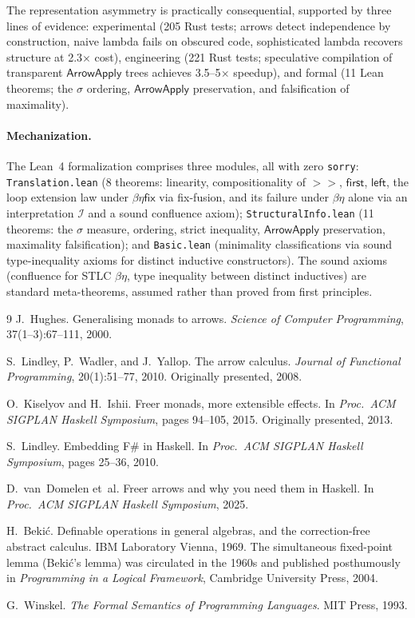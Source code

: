 \documentclass[11pt,a4paper]{article}
\theoremstyle{definition}
\theoremstyle{remark}
\newcommand{\comp}{\mathbin{>\!\!>}}
\newcommand{\first}{\mathsf{first}}
\newcommand{\leftc}{\mathsf{left}}
\newcommand{\ArrowApply}{\mathsf{ArrowApply}}
\newcommand{\fix}{\mathsf{fix}}
\newcommand{\interp}{\mathcal{I}}
\begin{document}
The representation asymmetry is practically consequential, supported
by three lines of evidence: experimental (205 Rust tests; arrows
detect independence by construction, naive lambda fails on obscured
code, sophisticated lambda recovers structure at 2.3$\times$ cost),
engineering (221 Rust tests; speculative compilation of transparent
$\ArrowApply$ trees achieves 3.5--5$\times$ speedup), and formal (11
Lean theorems; the $\sigma$ ordering, $\ArrowApply$ preservation, and
falsification of maximality).

\paragraph{Mechanization.}
The Lean~4 formalization comprises three modules, all with zero
\texttt{sorry}: \texttt{Translation.lean} (8 theorems: linearity,
compositionality of $\comp$, $\first$, $\leftc$, the loop extension law
under $\beta\eta\fix$ via fix-fusion, and its failure under $\beta\eta$
alone via an interpretation $\interp$ and a sound confluence axiom);
\texttt{StructuralInfo.lean} (11 theorems: the $\sigma$ measure,
ordering, strict inequality, $\ArrowApply$ preservation, maximality
falsification); and \texttt{Basic.lean} (minimality classifications via
sound type-inequality axioms for distinct inductive constructors). The
sound axioms (confluence for STLC $\beta\eta$, type inequality between
distinct inductives) are standard meta-theorems, assumed rather than
proved from first principles.


\begin{thebibliography}{9}
J.~Hughes.
\newblock Generalising monads to arrows.
\newblock \emph{Science of Computer Programming}, 37(1--3):67--111, 2000.

S.~Lindley, P.~Wadler, and J.~Yallop.
\newblock The arrow calculus.
\newblock \emph{Journal of Functional Programming}, 20(1):51--77, 2010.
\newblock Originally presented, 2008.

O.~Kiselyov and H.~Ishii.
\newblock Freer monads, more extensible effects.
\newblock In \emph{Proc.\ ACM SIGPLAN Haskell Symposium}, pages 94--105, 2015.
\newblock Originally presented, 2013.

S.~Lindley.
\newblock Embedding {F\#} in {H}askell.
\newblock In \emph{Proc.\ ACM SIGPLAN Haskell Symposium}, pages 25--36, 2010.

D.~van~Domelen et~al.
\newblock Freer arrows and why you need them in {H}askell.
\newblock In \emph{Proc.\ ACM SIGPLAN Haskell Symposium}, 2025.

H.~Beki\'c.
\newblock Definable operations in general algebras, and the correction-free
  abstract calculus.
\newblock IBM Laboratory Vienna, 1969.
\newblock The simultaneous fixed-point lemma (Beki\'c's lemma) was circulated
  in the 1960s and published posthumously in \emph{Programming in a Logical
  Framework}, Cambridge University Press, 2004.

G.~Winskel.
\newblock \emph{The Formal Semantics of Programming Languages}.
\newblock MIT Press, 1993.
\end{thebibliography}
\end{document}
